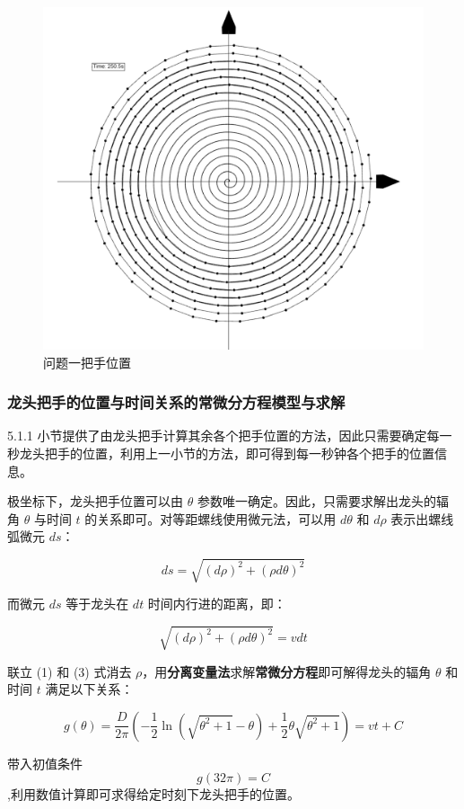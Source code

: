 \documentclass[a4paper]{article}
\begin{document}
		\begin{figure}[H]
			\centering
			\includegraphics[width=0.6\linewidth]{image/Figure_5111.png}
			\caption{问题一把手位置}
			\label{Figure_5111}
		\end{figure}

	\subsubsection{龙头把手的位置与时间关系的常微分方程模型与求解}

		5.1.1 小节提供了由龙头把手计算其余各个把手位置的方法，因此只需要确定每一秒龙头把手的位置，利用上一小节的方法，即可得到每一秒钟各个把手的位置信息。

		极坐标下，龙头把手位置可以由 $\theta$ 参数唯一确定。因此，只需要求解出龙头的辐角 $\theta$ 与时间 $t$ 的关系即可。对等距螺线使用微元法，可以用 $d\theta$ 和 $d\rho$ 表示出螺线弧微元 $ds$：

		$$ ds = \sqrt{(d\rho)^2 + (\rho d\theta) ^ 2}$$

		而微元 $ds$ 等于龙头在 $dt$ 时间内行进的距离，即：

		\begin{equation}
			\sqrt{(d\rho)^2 + (\rho d\theta) ^ 2} = vdt
		\end{equation}

		联立 (1) 和 (3) 式消去 $\rho$，用\textbf{分离变量法}求解\textbf{常微分方程}即可解得龙头的辐角 $\theta$ 和时间 $t$ 满足以下关系：

		\begin{equation}
			g(\theta) = \frac{D}{2\pi}(-\frac{1}{2}\ln(\sqrt{\theta^2+1}-\theta)+\frac{1}{2}\theta\sqrt{\theta^2+1})=vt+C
		\end{equation}

		带入初值条件$$g(32  \pi) = C$$,利用数值计算即可求得给定时刻下龙头把手的位置。
\end{document}
